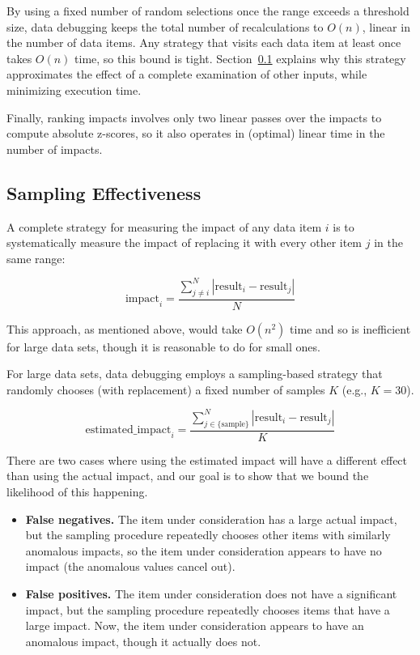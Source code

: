 By using a fixed number of random selections once the range
exceeds a threshold size, data debugging keeps the total number of
recalculations to $O(n)$, linear in the number of data items. Any
strategy that visits each data item at least once takes $O(n)$ time,
so this bound is tight. Section~\ref{sec:sampling_effectiveness}
explains why this strategy approximates the effect of a complete
examination of other inputs, while minimizing execution time.

Finally, ranking impacts involves only two linear passes over the
impacts to compute absolute z-scores, so it also operates in (optimal)
linear time in the number of impacts.

\subsection{Sampling Effectiveness}
\label{sec:sampling_effectiveness}

A complete strategy for measuring the impact of any data item $i$ is to
systematically measure the impact of replacing it with every other
item $j$ in the same range:

\begin{equation}
\mbox{impact}_i = \frac{\sum_{j \neq i}^{N}{|\mbox{result}_i-\mbox{result}_j|}}{N}
\end{equation}

\noindent
This approach, as mentioned above, would take $O(n^2)$ time and so is
inefficient for large data sets, though it is reasonable to do for
small ones.

For large data sets, data debugging employs a sampling-based strategy
that randomly chooses (with replacement) a fixed number of samples $K$
(e.g., $K = 30$).

\begin{equation}
\mbox{estimated\_impact}_i = \frac{\sum_{j \in \{\mbox{sample}\}}^{N}{|\mbox{result}_i-\mbox{result}_j|}}{K}
\end{equation}

\noindent
There are two cases where using the estimated impact will have a different effect than using the actual impact, and our goal is to show that we bound the likelihood of this happening.

\begin{itemize}
\item \textbf{False negatives.} The item under consideration has a
  large actual impact, but the sampling procedure repeatedly
  chooses other items with similarly anomalous impacts, so the item under
  consideration appears to have no impact (the anomalous values cancel out).
\item \textbf{False positives.} The item under consideration does
  not have a significant impact, but the sampling procedure
  repeatedly chooses items that have a large impact. Now, the item
  under consideration appears to have an anomalous impact, though it actually does not.
\end{itemize}

